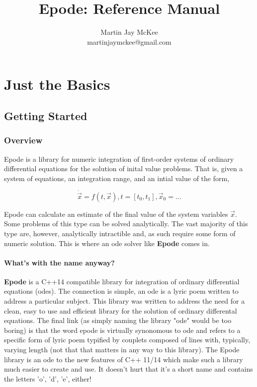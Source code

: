 \documentclass[letterpaper,10pt]{book}
\title{Epode: Reference Manual}
\author{Martin Jay McKee\\martinjaymckee@gmail.com}
\newcommand{\deemph}[1]{{\color{black!40}#1}}
\newcommand{\epode}[0]{\textbf{Epode}}
\begin{document}
\maketitle 
\tableofcontents

\part{Just the Basics}
  \chapter{Getting Started}
    \section{Overview}
      Epode is a \deemph{library} for numeric integration of first-order systems of ordinary differential equations for the solution of inital value problems.  That is, given a system of equations, an integration range, and an intial value of the form,

      \begin{equation}
	\dot{\vec{x}} = f(t, \vec{x}), t = [t_{0}, t_{1}], \vec{x}_{0} = ...  
      \end{equation}

      Epode can calculate an estimate of the final value of the system variables $\vec{x}$.  Some problems of this type can be solved analytically.  The vast majority of this type are, however, analytically intractible and, as such require some form of numeric solution.  This is where an ode solver like \epode{} comes in.

      \subsection{What's with the name anyway?}
	\epode{} is a C++14 compatible library for integration of ordinary differential equations (odes). The connection is simple, an ode is a lyric poem written to address a particular subject.  This library was written to address the need for a clean, easy to use and efficient library for the solution of ordinary differental equations.  The final link (as simply naming the library "ode" would be too boring) is that the word epode is virtually synonomous to ode and refers to a specific form of lyric poem typified by couplets composed of lines with, typically, varying length (not that that matters in any way to this library).  The Epode library is an ode to the new features of C++ 11/14 which make such a library much easier to create and use.  It doesn't hurt that it's a short name and contains the letters 'o', 'd', 'e', either!      
      
\end{document}
